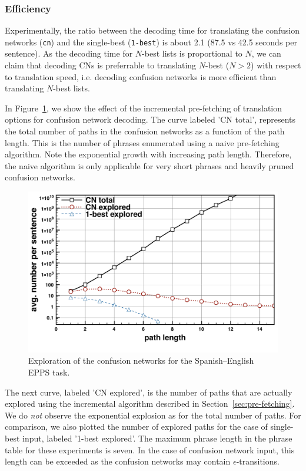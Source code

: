 \documentclass[10pt]{report}
\theoremstyle{plain}
\begin{document}
{\subsubsection{Efficiency}

Experimentally, the ratio between the decoding time for translating the confusion networks ({\tt cn}) and the single-best ({\tt 1-best}) is about 2.1 (87.5 vs 42.5 seconds per sentence). 
As the decoding time for $N$-best lists is proportional to $N$, we can claim that decoding CNs  is preferrable to translating $N$-best ($N>2$) with respect to translation speed, i.e. decoding confusion networks is more efficient than translating $N$-best lists.


In Figure~\ref{fig-cn-exploration}, we show the effect of the incremental pre-fetching of translation options for confusion network decoding.
The curve labeled 'CN total', represents the total number of paths in the confusion networks as a function of the path length.
This is the number of phrases enumerated using a naive pre-fetching algorithm.
Note the exponential growth with increasing path length.
Therefore, the naive algorithm is only applicable for very short phrases and heavily pruned confusion networks.
\begin{figure} 
	\begin{center}
		\includegraphics[width=0.85\linewidth]{CN_PathExploration}
		\caption{Exploration of the confusion networks for the Spanish--English EPPS task.}\label{fig-cn-exploration}
	\end{center}
\end{figure}
The next curve, labeled 'CN explored', is the number of paths that are actually explored using the incremental algorithm described in Section~\ref{sec:pre-fetching}.
We do {\em not} observe the exponential explosion as for the total number of paths.
For comparison, we also plotted the number of explored paths for the case of single-best input, labeled '1-best explored'.
The maximum phrase length in the phrase table for  these experiments is seven.
In the case of confusion network input, this length can be exceeded as the confusion networks may contain $\epsilon$-transitions.




}
\end{document}

